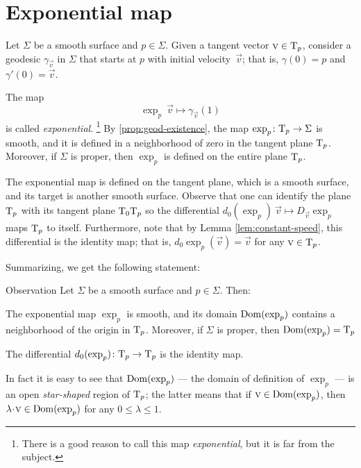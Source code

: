 \section{Exponential map}\label{sec:exp}

Let $\Sigma$ be a smooth surface and $p\in \Sigma$.
Given a tangent vector ${\text{\sc{v}}}\in \mathrm{T}_p$, consider a geodesic $\gamma_{\vec v}$ in $\Sigma$ that starts at $p$ with initial velocity~$\vec v$; 
that is, $\gamma(0)=p$ and $\gamma'(0)={\vec v}$.

The map 
\[\exp_p\:\vec v\mapsto \gamma_{\vec v}(1)\]
is called \emph{exponential}.%
\footnote{There is a good reason to call this map {}\emph{exponential}, but it is far from the subject.}
By \ref{prop:geod-existence}, the map $\exp_p\colon\mathrm{T}_p\to \Sigma$ is smooth, and it is defined in a neighborhood of zero in the tangent plane $\mathrm{T}_p$.
Moreover, if $\Sigma$ is proper, then $\exp_p$ is defined on the entire plane $\mathrm{T}_p$.

The exponential map
is defined on the tangent plane, which is a smooth surface,
and its target is another smooth surface.
Observe that one can identify the plane $\mathrm{T}_p$
with its tangent plane $\mathrm{T}_0\mathrm{T}_p$ so the differential $d_0(\exp_p)\:\vec v\mapsto D_{\vec v}\exp_p$ maps $\mathrm{T}_p$ to itself.
Furthermore, note that by Lemma \ref{lem:constant-speed}, this differential is the identity map; that is, $d_0\exp_p(\vec v)=
\vec v$ for any $\text{\sc{v}}\in \mathrm{T}_p$.

Summarizing, we get the following statement:

\begin{thm}{Observation}\label{obs:d(exp)=1}
Let $\Sigma$ be a smooth surface and $p\in \Sigma$.
Then:

\begin{subthm}{}
The exponential map $\exp_p$ is smooth, and its domain $\mathop{\rm Dom}\nolimits(\exp_p)$ contains a neighborhood of the origin in $\mathrm{T}_p$.
Moreover, if $\Sigma$ is proper, then $\mathop{\rm Dom}\nolimits(\exp_p)=\mathrm{T}_p$
\end{subthm}

\begin{subthm}{}
The differential $d_0(\exp_p)\colon\mathrm{T}_p\to \mathrm{T}_p$ is the identity map.
\end{subthm}

\end{thm}

In fact it is easy to see that $\mathop{\rm Dom}\nolimits(\exp_p)$ --- the domain of definition of $\exp_p$ --- is an open \emph{star-shaped} region of $\mathrm{T}_p$;
the latter means that if $\text{\sc{v}}\in \mathop{\rm Dom}\nolimits(\exp_p)$, then $\lambda\cdot\vec v\in \Dom(\exp_p)$ for any $0\le \lambda\le 1$.


